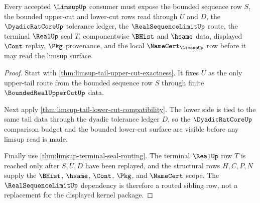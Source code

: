 \begin{theorem}
\label{thm:limsup-scope-kernel-dependencies}
Every accepted $\LimsupUp$ consumer must expose the bounded sequence row $S$, the bounded upper-cut and lower-cut rows read through $U$ and $D$, the $\DyadicRatCoreUp$ tolerance ledger, the $\RealSequenceLimitUp$ route, the terminal $\RealUp$ seal $T$, componentwise $\BHist$ and $\hsame$ data, displayed $\Cont$ replay, $\Pkg$ provenance, and the local $\NameCert_{\LimsupUp}$ row before it may read the limsup surface.
\end{theorem}
\begin{proof}
Start with \autoref{thm:limsup-tail-upper-cut-exactness}. It fixes $U$ as the only upper-tail route from the bounded sequence row $S$ through finite $\BoundedRealUpperCutUp$ data.

Next apply \autoref{thm:limsup-tail-lower-cut-compatibility}. The lower side is tied to the same tail data through the dyadic tolerance ledger $D$, so the $\DyadicRatCoreUp$ comparison budget and the bounded lower-cut surface are visible before any limsup read is made.

Finally use \autoref{thm:limsup-terminal-seal-routing}. The terminal $\RealUp$ row $T$ is reached only after $S,U,D$ have been replayed, and the structural rows $H,C,P,N$ supply the $\BHist$, $\hsame$, $\Cont$, $\Pkg$, and $\NameCert$ scope. The $\RealSequenceLimitUp$ dependency is therefore a routed sibling row, not a replacement for the displayed kernel package.
\end{proof}

